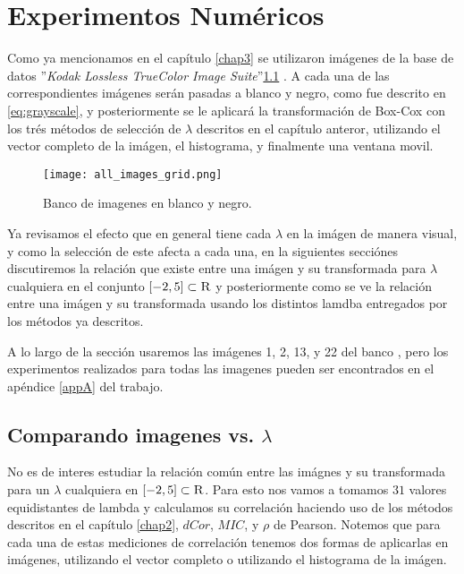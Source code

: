 \chapter{Experimentos Num\'ericos}\label{chap5}

    Como ya mencionamos en el cap\'itulo \ref{chap3} se utilizaron im\'agenes de la base de datos ''\textit{Kodak Lossless TrueColor Image Suite}''\ref{fig:rgb2gray_2} \cite{KodakLosslessTrueColorImageSuite}. A cada una de las correspondientes im\'agenes ser\'an pasadas a blanco y negro, como fue descrito en \ref{eq:grayscale}, y posteriormente se le aplicar\'a la transformaci\'on de Box-Cox con los tr\'es m\'etodos de selecci\'on de $\lambda$ descritos en el cap\'itulo anteror, utilizando el vector completo de la im\'agen, el histograma, y finalmente una ventana movil.

    \begin{figure}[H]
        \centering
        \texttt{[image: all\_images\_grid.png]}
        \caption{Banco de imagenes en blanco y negro.}
        \label{fig:rgb2gray_2}
    \end{figure}
    
    Ya revisamos el efecto que en general tiene cada $\lambda$ en la im\'agen de manera visual, y como la selecci\'on de este afecta a cada una, en la siguientes secci\'ones discutiremos la relaci\'on que existe entre una im\'agen y su transformada para $\lambda$ cualquiera en el conjunto $[-2, 5]\subset\textsc{R}$ y posteriormente como se ve la relaci\'on entre una im\'agen y su transformada usando los distintos lamdba entregados por los m\'etodos ya descritos.

    A lo largo de la secci\'on usaremos las im\'agenes 1, 2, 13, y 22 del banco \cite{KodakLosslessTrueColorImageSuite}, pero los experimentos realizados para todas las imagenes pueden ser encontrados en el ap\'endice \ref{appA} del trabajo. 
    

\section[Comparando imagenes vs. lambda]{Comparando imagenes vs. $\lambda$}

    No es de interes estudiar la relaci\'on com\'un entre las im\'agnes y su transformada para un $\lambda$ cualquiera en $[-2, 5]\subset\textsc{R}$. Para esto nos vamos a tomamos $31$ valores equidistantes de lambda y calculamos su correlaci\'on haciendo uso de los m\'etodos descritos en el cap\'itulo \ref{chap2}, $dCor$, $MIC$, y $\rho$ de Pearson. Notemos que para cada una de estas mediciones de correlaci\'on tenemos dos formas de aplicarlas en im\'agenes, utilizando el vector completo o utilizando el histograma de la im\'agen. 

